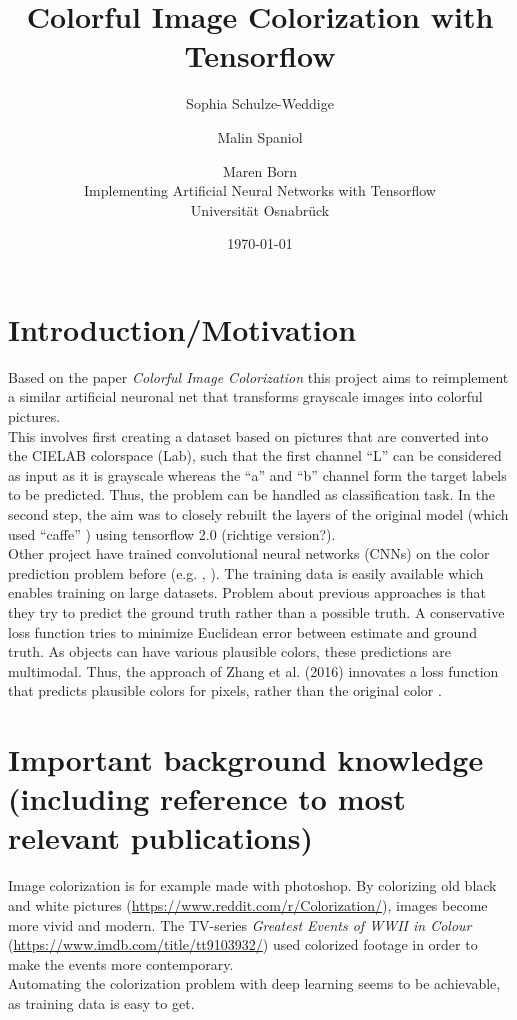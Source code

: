 \documentclass[12pt,letterpaper]{article}
\title{Colorful Image Colorization with Tensorflow}
\date{\today}
\author{Sophia Schulze-Weddige \and Malin Spaniol \and Maren Born \\Implementing Artificial Neural Networks with Tensorflow \\Universität Osnabrück}
\begin{document}
\maketitle
\thispagestyle{empty}
\newpage
\thispagestyle{empty}
\tableofcontents
\newpage
\section{Introduction/Motivation}
Based on the paper \emph{Colorful Image Colorization} \citep{Zhang.2016} this project aims to reimplement a similar artificial neuronal net that transforms grayscale images into colorful pictures.\\
This involves first creating a dataset based on pictures that are converted into the CIELAB colorspace (Lab), such that the first channel \enquote{L} can be considered as input as it is grayscale whereas the \enquote{a} and \enquote{b} channel form the target labels to be predicted. Thus, the problem can be handled as classification task. In the second step, the aim was to closely rebuilt the layers of the original model (which used \enquote{caffe} \citep{jia2014caffe}) using tensorflow 2.0 (richtige version?).\\
Other project have trained convolutional neural networks (CNNs) on the color prediction problem before (e.g. \cite{Cheng_2015}, \cite{Dahl.2016}). The training data is easily available which enables training on large datasets. Problem about previous approaches is that they try to predict the ground truth rather than a possible truth. A conservative loss function tries to minimize Euclidean error between estimate and ground truth. As objects can have various plausible colors, these predictions are multimodal. Thus, the approach of Zhang et al. (2016) innovates a loss function that predicts plausible colors for pixels, rather than the original color \citep{Zhang.2016}.\\

\section{Important background knowledge (including reference to most relevant publications)}
Image colorization is for example made with photoshop. By colorizing old black and white pictures (\url{https://www.reddit.com/r/Colorization/}), images become more vivid and modern. The TV-series \emph{Greatest Events of WWII in Colour} (\url{https://www.imdb.com/title/tt9103932/}) used colorized footage in order to make the events more contemporary.\\
Automating the colorization problem with deep learning seems to be achievable, as training data is easy to get.\\
\end{document}
